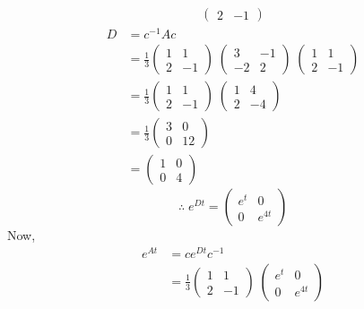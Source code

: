 \documentclass[../main-sheet.tex]{subfiles}
\begin{document}
\begin{soln}
\begin{align*}
\begin{pmatrix}
            2 & -1
        \end{pmatrix}
    \end{align*}
    \begin{align*}
        D&=c^{-1}Ac\\
        &=\frac{1}{3}\begin{pmatrix}
            1 & 1\\
            2 & -1
        \end{pmatrix}\;\begin{pmatrix}
            3 & -1\\
            -2 & 2
        \end{pmatrix}\;\begin{pmatrix}
            1 & 1\\
            2 & -1
        \end{pmatrix}\\
        &=\frac{1}{3}\begin{pmatrix}
            1 & 1\\
            2 & -1
        \end{pmatrix}\;\begin{pmatrix}
            1 & 4\\
            2 & -4
        \end{pmatrix}\\
        &=\frac{1}{3}\begin{pmatrix}
            3 & 0\\
            0 & 12
        \end{pmatrix}\\
        &=\begin{pmatrix}
            1 & 0\\
            0 & 4
        \end{pmatrix}
    \end{align*}
    \[\therefore\; e^{Dt}=\begin{pmatrix}
        e^t & 0\\
        0 & e^{4t}
    \end{pmatrix}\]
    Now,
    \begin{align*}
        e^{At}&=ce^{Dt}c^{-1}\\
        &=\frac{1}{3}\begin{pmatrix}
            1 & 1\\
            2 & -1
        \end{pmatrix}\;\begin{pmatrix}
            e^{t} & 0\\
            0 & e^{4t}

\end{pmatrix}
\end{align*}
\end{soln}
\end{document}
